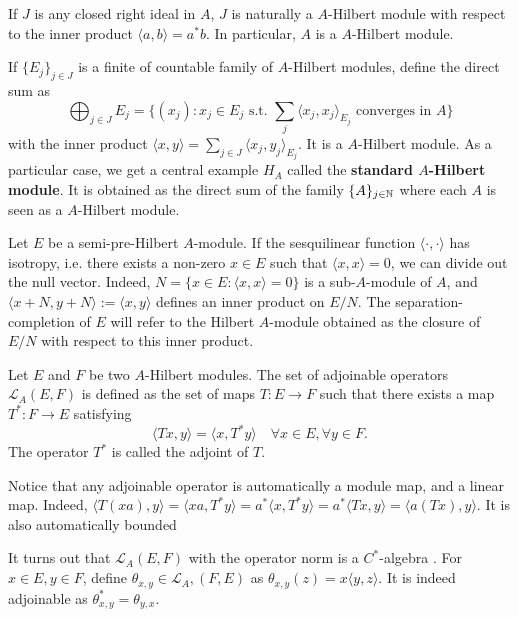 \begin{Expl} If $J$ is any closed right ideal in $A$, $J$ is naturally a $A$-Hilbert module with respect to the inner product $\langle a, b \rangle = a^* b$. In particular, $A$ is a $A$-Hilbert module.
\end{Expl}

\begin{Expl}
If $\{E_j\}_{j\in J}$ is a finite of countable family of $A$-Hilbert modules, define the direct sum as
\[\bigoplus_{j\in J} E_j = \{(x_j) : x_j\in E_j \text{ s.t. } \sum_j \langle x_j,x_j\rangle_{E_j} \text{ converges in } A\}\]
with the inner product $\langle x,y \rangle = \sum_{j\in J} \langle x_j, y_j\rangle_{E_j} $. It is a $A$-Hilbert module. As a particular case, we get a central example $H_A$ called the \textbf{standard $A$-Hilbert module}. It is obtained as the direct sum of the family $\{A\}_{j\in \mathbb N}$ where each $A$ is seen as a $A$-Hilbert module.
\end{Expl}

Let $E$ be a semi-pre-Hilbert $A$-module. If the sesquilinear function $\langle \cdot ,\cdot \rangle$ has isotropy, i.e. there exists a non-zero $x\in E$ such that $\langle x,x\rangle =0$, we can divide out the null vector. Indeed, $N= \{x\in E : \langle x,x\rangle = 0\}$ is a sub-$A$-module of $A$, and $\langle x+ N,y+N\rangle := \langle x,y\rangle $ defines an inner product on $E/N$. The separation-completion of $E$ will refer to the Hilbert $A$-module obtained as the closure of $E/N$ with respect to this inner product. 

\begin{definition}
Let $E$ and $F$ be two $A$-Hilbert modules. The set of adjoinable operators $\mathcal L_A(E,F)$ is defined as the set of maps $T : E\rightarrow F $ such that there exists a map $T^* : F\rightarrow E$ satisfying 
\[\langle Tx, y \rangle = \langle x ,T^* y\rangle\quad \forall x\in E,\forall y\in F.\]
The operator $T^*$ is called the adjoint of $T$.
\end{definition}

\begin{rk}
Notice that any adjoinable operator is automatically a module map, and a linear map. Indeed, $\langle T(xa),y\rangle = \langle xa,T^* y \rangle = a^* \langle x, T^* y\rangle =a^*\langle Tx,  y\rangle =  \langle a(Tx),y \rangle$. It is also automatically bounded
\end{rk}

It turns out that $\mathcal L_A(E,F)$ with the operator norm is a $C^*$-algebra \cite{Lance}. For $x\in E,y\in F$, define $\theta_{x,y}\in\mathcal L_A,(F,E)$ as $\theta_{x,y}(z) = x\langle y,z\rangle$. It is indeed adjoinable as $\theta_{x,y}^*=\theta_{y,x}$.

